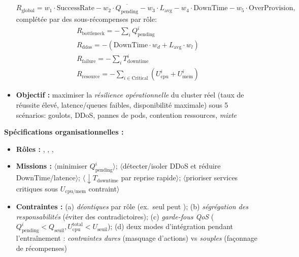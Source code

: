\begin{itemize}
        \[
          R_{\text{global}}=
          w_1\cdot\text{SuccessRate}
          -w_2\cdot\overline{Q_{\text{pending}}}
          -w_3\cdot L_{\text{avg}}
          -w_4\cdot \text{DownTime}
          -w_5\cdot \text{OverProvision},
        \]
        complétée par des sous-récompenses par rôle:
        \begin{gather*}
          R_{\text{bottleneck}}=-\sum_i Q_{\text{pending}}^i                  \\
          R_{\text{ddos}}=-(\text{DownTime}\cdot w_d+L_{\text{avg}}\cdot w_l) \\
          R_{\text{failure}}=-\sum_i T_{\text{downtime}}^i                    \\
          R_{\text{resource}}=-\sum_{i\in\text{Critical}}(U_{\text{cpu}}^i+U_{\text{mem}}^i)
        \end{gather*}

  \item \textbf{Objectif :} maximiser la \emph{résilience opérationnelle} du cluster réel (taux de réussite élevé, latence/queues faibles, disponibilité maximale) sous 5 scénarios: goulots, DDoS, pannes de pods, contention ressources, \emph{mixte}
\end{itemize}

\noindent\textbf{Spécifications organisationnelles :}
\begin{itemize}
  \item \textbf{Rôles :} , , , 
  \item \textbf{Missions :}
        \(\langle\)minimiser \(Q_{\text{pending}}^i\)\(\rangle\);
        \(\langle\)détecter/isoler DDoS et réduire DownTime/latence\(\rangle\);
        \(\langle\)\(\downarrow T_{\text{downtime}}\) par reprise rapide\(\rangle\);
        \(\langle\)prioriser services critiques sous \(U_{\text{cpu/mem}}\) contraint\(\rangle\)
  \item \textbf{Contraintes :}
        (a) \emph{déontiques} par rôle (ex.~seul  peut );
        (b) \emph{ségrégation des responsabilités} (éviter des  contradictoires);
        (c) \emph{garde-fous QoS} (\(Q_{\text{pending}}^i<Q_{\text{seuil}}, U_{\text{cpu}}^{\text{total}}<U_{\text{seuil}}\));
        (d) deux modes d'intégration pendant l'entraînement : \textit{contraintes dures} (masquage d'actions) vs \textit{souples} (façonnage de récompenses)
\end{itemize}

